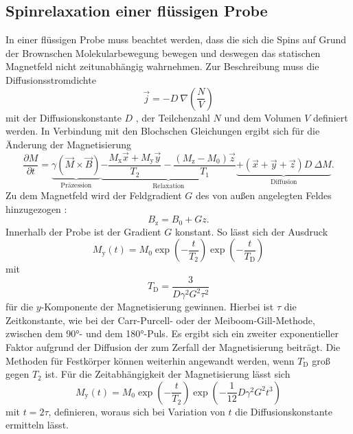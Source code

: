 \subsection{Spinrelaxation einer flüssigen Probe}
In einer flüssigen Probe muss beachtet werden, dass die sich die Spins auf
Grund der Brownschen Molekularbewegung bewegen und deswegen das statischen Magnetfeld
nicht zeitunabhängig wahrnehmen. Zur Beschreibung muss die Diffusionsstromdichte
\begin{equation}
  \vec{j} = - D\:\nabla\!\left(\frac{N}{V}\right)
\end{equation}
mit der Diffusionskonstante $D$ , der Teilchenzahl $N$ und dem Volumen $V$ definiert werden.
In Verbindung mit den Blochschen Gleichungen ergibt sich für die Änderung der
Magnetisierung
\begin{equation}
  \frac{\partial M}{\partial t} =
  \underbrace{\gamma \left(\vec{M} \times \vec{B}\right)}_{\text{Präzession}}
  \underbrace{- \frac{M_\text{x} \vec{x} + M_\text{y} \vec{y}}{T_2}
  - \frac{\left(M_\text{z} - M_0\right) \vec{z}}{T_1}}_{\text{Relaxation}}
  \underbrace{+ \left(\vec{x} + \vec{y} + \vec{z}\right) D\:\Delta M}_{\text{Diffusion}} .
\end{equation}
Zu dem Magnetfeld wird der Feldgradient $G$  des von außen angelegten Feldes hinzugezogen :
\begin{equation}
  B_\text{z} = B_0 + G z .
\end{equation}
Innerhalb der Probe ist der Gradient $G$ konstant.
So lässt sich der Ausdruck
\begin{equation*}
  M_\text{y}\!\left(t\right) = M_0
  \exp\!\left(- \frac{t}{T_2}\right)
  \exp\!\left(- \frac{t}{T_\text{D}}\right)
\end{equation*}
mit
\begin{equation*}
  T_\text{D} = \frac{3}{D \gamma^2 G^2 \tau^2}
\end{equation*}
für die $y$-Komponente der Magnetisierung gewinnen.
Hierbei ist $\tau$ die Zeitkonstante, wie bei der Carr-Purcell- oder der Meiboom-Gill-Methode, zwischen
dem 90°- und dem 180°-Puls.
Es ergibt sich ein zweiter exponentieller Faktor aufgrund der Diffusion der
zum Zerfall der Magnetisierung beiträgt.
Die Methoden für Festkörper können weiterhin
angewandt werden, wenn $T_\text{D}$ groß gegen $T_2$ ist.
Für die Zeitabhängigkeit der Magnetisierung lässt sich
\begin{equation}
  M_\text{y}\!\left(t\right) = M_0
  \exp\!\left(-\frac{t}{T_2}\right)
  \exp\!\left(-\frac{1}{12} D \gamma^2 G^2 t^3\right)
  \label{eq:DiffusionsBestimmung}
\end{equation}
mit $t = 2\tau$, definieren,
woraus sich bei Variation von $t$ die Diffusionskonstante ermitteln lässt.
